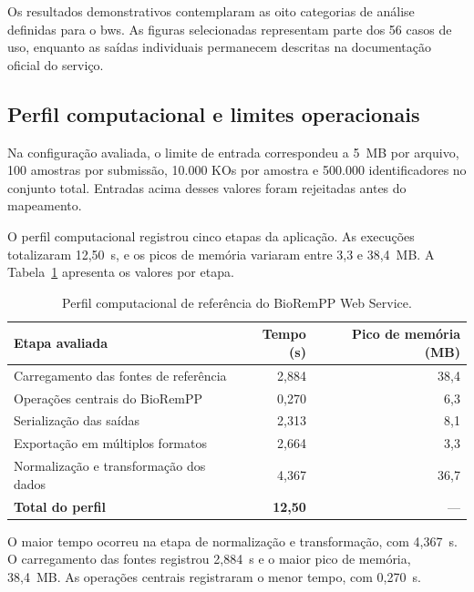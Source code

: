 Os resultados demonstrativos contemplaram as oito categorias de análise
definidas para o \gls{bws}. As figuras selecionadas representam parte dos 56
casos de uso, enquanto as saídas individuais permanecem descritas na
documentação oficial do serviço.

\clearpage

\subsection{Perfil computacional e limites operacionais}

Na configuração avaliada, o limite de entrada correspondeu a 5~MB por arquivo,
100 amostras por submissão, 10.000 KOs por amostra e 500.000 identificadores
no conjunto total. Entradas acima desses valores foram rejeitadas antes do
mapeamento.

O perfil computacional registrou cinco etapas da aplicação. As execuções
totalizaram 12,50~s, e os picos de memória variaram entre 3,3 e 38,4~MB. A
Tabela~\ref{tab:c3-computational-profile} apresenta os valores por etapa.

\begin{table}[htbp]
\centering
\caption{Perfil computacional de referência do BioRemPP Web Service.}
\label{tab:c3-computational-profile}
\small
\begin{tabularx}{\textwidth}{@{}Xrr@{}}
\toprule
\textbf{Etapa avaliada}
& \textbf{Tempo (s)}
& \textbf{Pico de memória (MB)} \\
\midrule

Carregamento das fontes de referência
& 2,884
& 38,4 \\

Operações centrais do BioRemPP
& 0,270
& 6,3 \\

Serialização das saídas
& 2,313
& 8,1 \\

Exportação em múltiplos formatos
& 2,664
& 3,3 \\

Normalização e transformação dos dados
& 4,367
& 36,7 \\

\midrule
\textbf{Total do perfil}
& \textbf{12,50}
& --- \\

\bottomrule
\end{tabularx}
\end{table}

O maior tempo ocorreu na etapa de normalização e transformação, com
4,367~s. O carregamento das fontes registrou 2,884~s e o maior pico de memória,
38,4~MB. As operações centrais registraram o menor tempo, com 0,270~s.

